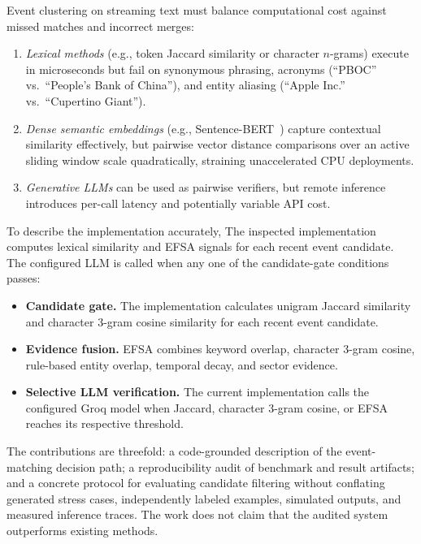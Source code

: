 \documentclass[sigconf,natbib=true,anonymous=true]{acmart}
\begin{document}
Event clustering on streaming text must balance computational cost against missed matches and incorrect merges:
\begin{enumerate}
    \item \textit{Lexical methods} (e.g., token Jaccard similarity or character $n$-grams) execute in microseconds but fail on synonymous phrasing, acronyms (``PBOC'' vs.\ ``People's Bank of China''), and entity aliasing (``Apple Inc.'' vs.\ ``Cupertino Giant'').
    \item \textit{Dense semantic embeddings} (e.g., Sentence-BERT~\cite{reimers2019sentence}) capture contextual similarity effectively, but pairwise vector distance comparisons over an active sliding window scale quadratically, straining unaccelerated CPU deployments.
    \item \textit{Generative LLMs} can be used as pairwise verifiers, but remote inference introduces per-call latency and potentially variable API cost.
\end{enumerate}

To describe the implementation accurately, The inspected implementation computes lexical similarity and EFSA signals for each recent event candidate. The configured LLM is called when any one of the candidate-gate conditions passes:
\begin{itemize}
    \item \textbf{Candidate gate.} The implementation calculates unigram Jaccard similarity and character 3-gram cosine similarity for each recent event candidate.
    \item \textbf{Evidence fusion.} EFSA combines keyword overlap, character 3-gram cosine, rule-based entity overlap, temporal decay, and sector evidence.
    \item \textbf{Selective LLM verification.} The current implementation calls the configured Groq model when Jaccard, character 3-gram cosine, or EFSA reaches its respective threshold.
\end{itemize}

The contributions are threefold: a code-grounded description of the event-matching decision path; a reproducibility audit of benchmark and result artifacts; and a concrete protocol for evaluating candidate filtering without conflating generated stress cases, independently labeled examples, simulated outputs, and measured inference traces. The work does not claim that the audited system outperforms existing methods.

\end{document}
